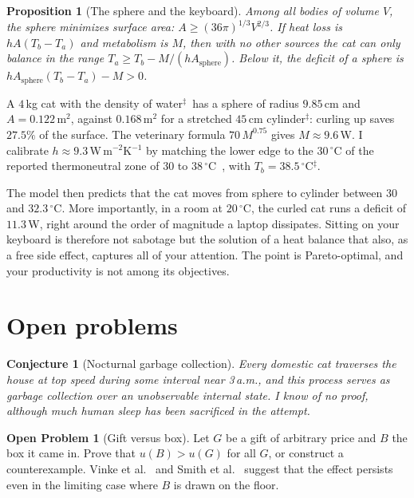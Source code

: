 \documentclass[11pt,a4paper]{article}
\theoremstyle{plain}
\newtheorem{proposicion}[teorema]{Proposition}
\newtheorem{conjetura}[teorema]{Conjecture}
\theoremstyle{definition}
\newtheorem{problema}[teorema]{Open Problem}
\theoremstyle{remark}
\numberwithin{equation}{section}
\newcommand{\calib}{{\ensuremath{^{\ddagger}}}}
\begin{document}
\begin{proposicion}[The sphere and the keyboard]\label{prop:esfera}
Among all bodies of volume $V$, the sphere minimizes surface area: $A\ge(36\pi)^{1/3}V^{2/3}$. If heat loss is $hA(T_b-T_a)$ and metabolism is $M$, then with no other sources the cat can only balance in the range $T_a\ge T_b-M/(hA_{\text{sphere}})$. Below it, the deficit of a sphere is $hA_{\text{sphere}}(T_b-T_a)-M>0$.
\end{proposicion}

A $4$\,kg cat with the density of water\calib\ has a sphere of radius $9.85$\,cm and $A=0.122$\,m$^2$, against $0.168$\,m$^2$ for a stretched $45$\,cm cylinder\calib: curling up saves $27.5\%$ of the surface. The veterinary formula $70\,M^{0.75}$ gives $M\approx 9.6$\,W. I calibrate $h\approx 9.3$\,W\,m$^{-2}$K$^{-1}$ by matching the lower edge to the $30\,^\circ$C of the reported thermoneutral zone of $30$ to $38\,^\circ$C~\cite{nrc}, with $T_b=38.5\,^\circ$C\calib.

The model then predicts that the cat moves from sphere to cylinder between $30$ and $32.3\,^\circ$C. More importantly, in a room at $20\,^\circ$C, the curled cat runs a deficit of $11.3$\,W, right around the order of magnitude a laptop dissipates. Sitting on your keyboard is therefore not sabotage but the solution of a heat balance that also, as a free side effect, captures all of your attention. The point is Pareto-optimal, and your productivity is not among its objectives.

\section{Open problems}\label{sec:abiertos}

\begin{conjetura}[Nocturnal garbage collection]
Every domestic cat traverses the house at top speed during some interval near 3\,a.m., and this process serves as garbage collection over an unobservable internal state. I know of no proof, although much human sleep has been sacrificed in the attempt.
\end{conjetura}

\begin{problema}[Gift versus box]
Let $G$ be a gift of arbitrary price and $B$ the box it came in. Prove that $u(B)>u(G)$ for all $G$, or construct a counterexample. Vinke et al.~\cite{vinke} and Smith et al.~\cite{smith} suggest that the effect persists even in the limiting case where $B$ is drawn on the floor.
\end{problema}
\end{document}
